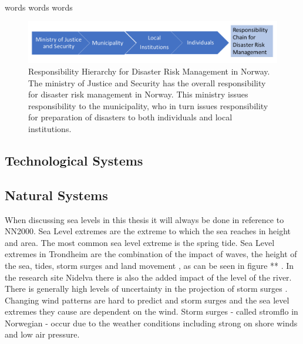 \paragraph{}


words words words
\begin{figure} [h]
    \centering
    \includegraphics[width=1\textwidth]{fig_theory/responsibility drm.png}
    \caption{Responsibility Hierarchy for Disaster Risk Management in Norway. The ministry of Justice and Security has the overall responsibility for disaster risk management in Norway. This ministry issues responsibility to the municipality, who in turn issues responsibility for preparation of disasters to both individuals and local institutions.}
    \label{fig:drm_responsibility}
\end{figure}
\paragraph{}

\subsection{Technological Systems}



\subsection{Natural Systems }
When discussing sea levels in this thesis it will always be done in reference to NN2000. Sea Level extremes are the extreme to which the sea reaches in height and area. The most common sea level extreme is the spring tide. Sea Level extremes in Trondheim are the combination of the impact of waves, the height of the sea, tides, storm surges and land movement \cite{hanssen-bauer_climate_2017}, as can be seen in figure ** . In the research site Nidelva there is also the added impact of the level of the river. There is generally high levels of uncertainty in the projection of storm surges \cite{nilsen_sealevelchangefornorway_nodate}. Changing wind patterns are hard to predict \cite{rod_three_2015} and storm surges and the sea level extremes they cause are dependent on the wind. Storm surges - called stromflo in Norwegian -  occur due to the weather conditions including strong on shore winds and low air pressure. \cite{hanssen_saksframlegg_2013'}

